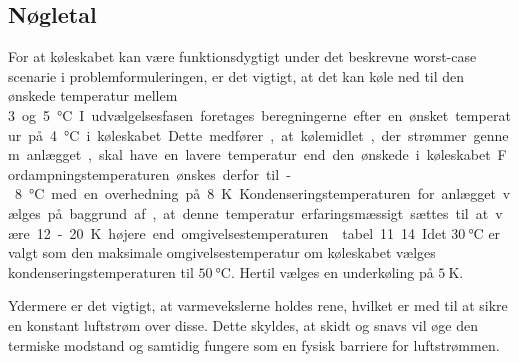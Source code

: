 \documentclass[../Hovedrapport.tex]{subfiles}
\begin{document}
\subsection{Nøgletal}
    \label{sec:noegletal}
For at køleskabet kan være funktionsdygtigt under det beskrevne worst-case scenarie i problemformuleringen, er det vigtigt, at det kan køle ned til den ønskede temperatur mellem \SI{3} og \SI{5}{\celsius}. I udvælgelsesfasen foretages beregningerne efter en ønsket temperatur på \SI{4}{\celsius} i køleskabet. Dette medfører, at kølemidlet, der strømmer gennem anlægget, skal have en lavere temperatur end den ønskede i køleskabet. Fordampningstemperaturen ønskes derfor til -\SI{8}{\celsius} med en overhedning på \SI{8}{\kelvin}.
Kondenseringstemperaturen for anlægget vælges på baggrund af, at denne temperatur erfaringsmæssigt sættes til at være 12 - 20 \si{\kelvin} højere end omgivelsestemperaturen \citep{koleteknik} tabel 11.14. Idet $\SI{30}{\celsius}$ er valgt som den maksimale omgivelsestemperatur om køleskabet vælges kondenseringstemperaturen til $\SI{50}{\celsius}$. Hertil vælges en underkøling på $\SI{5}{\kelvin}$.

Ydermere er det vigtigt, at varmevekslerne holdes rene, hvilket er med til at sikre en konstant luftstrøm over disse. Dette skyldes, at skidt og snavs vil øge den termiske modstand og samtidig fungere som en fysisk barriere for luftstrømmen.
\end{document}
